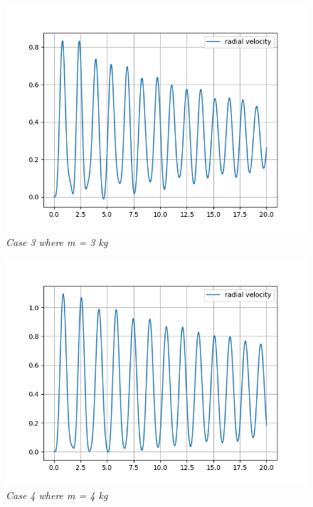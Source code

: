         \begin{figure}[H]
            \centering
            \includegraphics{Appendix/RSimPictures/R/rm3.png}
            \caption{\textit{Case 3 where m = 3 kg}}
            \label{}
        \end{figure}
            
        \begin{figure}[H]
            \centering
            \includegraphics{Appendix/RSimPictures/R/rm4.png}
            \caption{\textit{Case 4 where m = 4 kg}}
            \label{}
        \end{figure}
            
